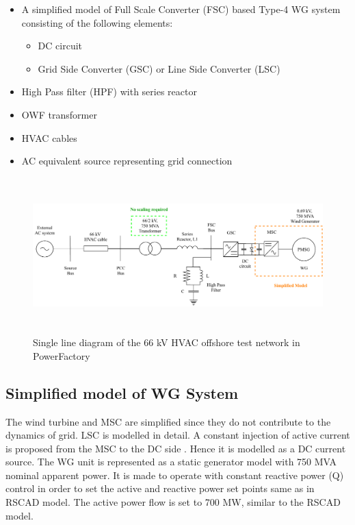 \begin{itemize}
    \item A simplified model of Full Scale Converter (FSC) based Type-4 \gls{WG} system consisting of the following elements:
    \begin{itemize}
        \item \gls{DC} circuit
        \item Grid Side Converter (\gls{GSC}) or Line Side Converter (\gls{LSC})
    \end{itemize}
    \item High Pass filter (\gls{HPF}) with series reactor
    \item \gls{OWF} transformer
    \item \gls{HVAC} cables  
    \item \gls{AC} equivalent source representing grid connection
\end{itemize}

\begin{figure}[H]
    \includegraphics[height = 6cm,width = \textwidth]{Diagrams/Chapter_3/WT1_AC_PFD.pdf}
    \caption{Single line diagram of the 66 kV HVAC offshore test network in PowerFactory}
    \label{fig:WT1_Model_PFD_comp}
\end{figure}

\subsection{Simplified model of WG System}
The wind turbine and \gls{MSC} are simplified since they do not contribute to the dynamics of grid. \gls{LSC} is modelled in detail. A constant injection of active current is proposed from the \gls{MSC} to the \gls{DC} side \cite{korai_dynamic_2019}. Hence it is modelled as a \gls{DC} current source. The \gls{WG} unit is represented as a static generator model with 750 MVA nominal apparent power. It is made to operate with constant reactive power (Q) control in order to set the active and reactive power set points same as in RSCAD model. The active power flow is set to 700 MW, similar to the RSCAD model.

